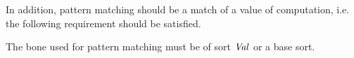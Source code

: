 In addition, pattern matching should be a match of a value of computation,
 i.e. the following requirement should be satisfied.

\begin{requirement}\label{req:pat}
  The bone used for pattern matching must be of sort $\mathit{Val}$ or a base sort.
\end{requirement}


